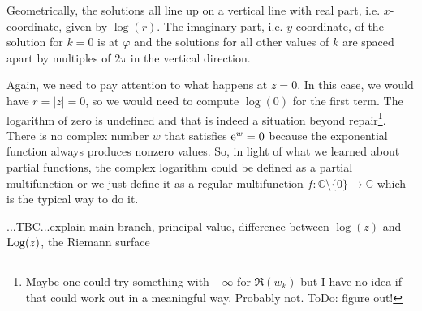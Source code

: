 \medskip
Geometrically, the solutions all line up on a vertical line with real part, i.e. $x$-coordinate, given by $\log(r)$. The imaginary part, i.e. $y$-coordinate, of the solution for $k=0$ is at $\varphi$ and the solutions for all other values of $k$ are spaced apart by multiples of $2 \pi$ in the vertical direction.  

\medskip
Again, we need to pay attention to what happens at $z=0$. In this case, we would have $r = |z| = 0$, so we would need to compute $\log(0)$ for the first term. The logarithm of zero is undefined and that is indeed a situation beyond repair\footnote{Maybe one could try something with $-\infty$ for $\Re(w_k)$ but I have no idea if that could work out in a meaningful way. Probably not. ToDo: figure out!}. There is no complex number $w$ that satisfies $\operatorname{\mathrm{e}}^w = 0$ because the exponential function always produces nonzero values. So, in light of what we learned about partial functions, the complex logarithm could be defined as a partial multifunction or we just define it as a regular multifunction $f: \mathbb{C} \setminus \{ 0 \} \rightarrow \mathbb{C}$ which is the typical way to do it.

...TBC...explain main branch, principal value, difference between $\log(z)$ and $\operatorname{Log}(z)$, the Riemann surface














